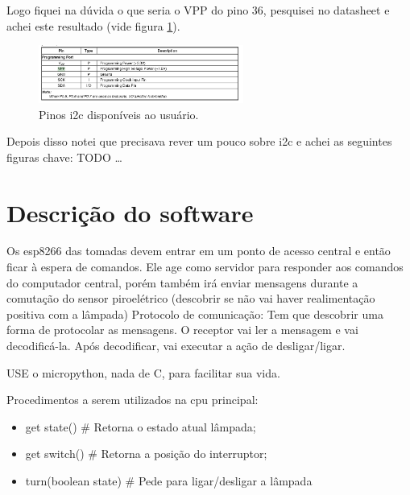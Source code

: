 \documentclass[11pt]{article}
\begin{document}
Logo fiquei na dúvida o que seria o VPP do pino 36, pesquisei no datasheet e achei este resultado (vide figura \ref{fig:vpp_meaning}).

\begin{figure}[h!]
\caption{\label{fig:vpp_meaning}Pinos i2c disponíveis ao usuário.}
\centering
\includegraphics[width=0.6\textwidth]{./vpp_meaning.png}
\end{figure}

Depois disso notei que precisava rever um pouco sobre i2c e achei as seguintes figuras chave:
TODO \ldots{}


\section{Descrição do software}
\label{sec:orgf05a8fb}
Os esp8266 das tomadas devem entrar em um ponto de acesso central e então ficar à espera de comandos. Ele age como servidor para responder aos comandos do computador central, porém também irá enviar mensagens durante a comutação do sensor piroelétrico (descobrir se não vai haver realimentação positiva com a lâmpada)
Protocolo de comunicação:
Tem que descobrir uma forma de protocolar as mensagens. O receptor vai ler a mensagem e vai decodificá-la. Após decodificar, vai executar a ação de desligar/ligar.

USE o micropython, nada de C, para facilitar sua vida.

Procedimentos a serem utilizados na cpu principal:
\begin{itemize}
\item get state() \# Retorna o estado atual lâmpada;
\item get switch() \# Retorna a posição do interruptor;
\item turn(boolean state) \# Pede para ligar/desligar a lâmpada
\end{itemize}
\end{document}
